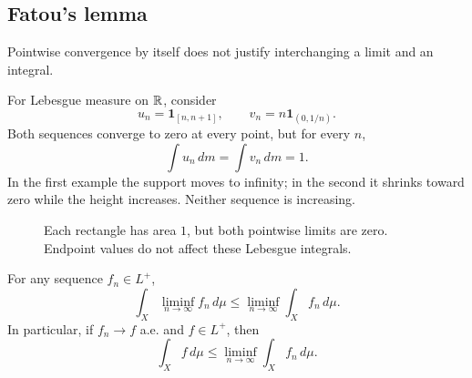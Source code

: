 \subsection{Fatou's lemma}

Pointwise convergence by itself does not justify interchanging a limit
and an integral.

\begin{example}
  \label{ex:escaping-mass-sep-22}
  For Lebesgue measure on $\mathbb{R}$, consider
  \[
    u_n=\mathbf 1_{[n,n+1]},
    \qquad v_n=n\mathbf 1_{(0,1/n)}.
  \]
  Both sequences converge to zero at every point, but for every $n$,
  \[
    \int u_n\,dm=\int v_n\,dm=1.
  \]
  In the first example
  the support moves to infinity; in the second it shrinks toward zero
  while the height increases. Neither sequence is increasing.
\end{example}

\begin{figure}[htbp]
  \centering
  \caption{Each rectangle has area $1$, but both pointwise limits are
    zero. Endpoint values do not affect these Lebesgue integrals.}
  \label{fig:escaping-mass-sep-22}
\end{figure}

\begin{theorem}\label{thm:fatou-sep-22}
  For any sequence $f_n\in L^+$,
  \[
    \int_X\liminf_{n\to\infty}f_n\,d\mu
      \leq\liminf_{n\to\infty}\int_X f_n\,d\mu.
  \]
  In particular, if $f_n\to f$ a.e. and $f\in L^+$, then
  \[
    \int_X f\,d\mu\leq\liminf_{n\to\infty}\int_X f_n\,d\mu.
  \]
\end{theorem}

